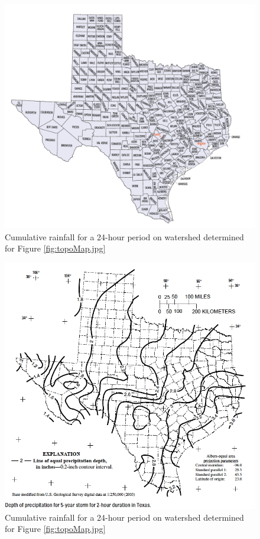 \documentclass[12pt]{article}
\begin{document}
\begin{enumerate}
\begin{figure}[h!] %
   \centering
   \includegraphics[width=6in]{countymap.jpg} 
   \caption{Cumulative rainfall for a 24-hour period on watershed determined for Figure \ref{fig:topoMap.jpg}}
   \label{fig:countymap.pdf}
\end{figure}

\begin{figure}[h!] %
   \centering
   \includegraphics[width=6in]{DDF-Atlas-5yr.jpg} 
   \caption{Cumulative rainfall for a 24-hour period on watershed determined for Figure \ref{fig:topoMap.jpg}}
   \label{fig:DDF-Atlas-5yr}
\end{figure}


\end{enumerate}
\end{document}

